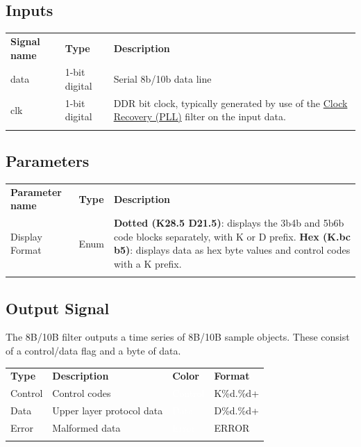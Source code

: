 \subsection{Inputs}

\begin{tabularx}{16cm}{llX}
\thickhline
\textbf{Signal name} & \textbf{Type} & \textbf{Description} \\
\thickhline
data & 1-bit digital & Serial 8b/10b data line \\
\thickhline
clk & 1-bit digital & DDR bit clock, typically generated by use of the \hyperref[filter:cdrpll]{Clock Recovery
(PLL)} filter on the input data.\\
\thickhline
\end{tabularx}

\subsection{Parameters}

\begin{tabularx}{16cm}{llX}
\thickhline
\textbf{Parameter name} & \textbf{Type} & \textbf{Description} \\
\thickhline
Display Format & Enum &
	\textbf{Dotted (K28.5 D21.5)}: displays the 3b4b and 5b6b code blocks separately, with K or D prefix. \newline
	\textbf{Hex (K.bc b5)}: displays data as hex byte values and control codes with a K prefix. \\
\thickhline
\end{tabularx}

\subsection{Output Signal}

The 8B/10B filter outputs a time series of 8B/10B sample objects. These consist of a control/data flag and a byte of
data.

\begin{tabularx}{16cm}{lllX}
\thickhline
\textbf{Type} & \textbf{Description} & \textbf{Color} & \textbf{Format} \\
\thickhline
Control & Control codes & \cellcolor{control}\textcolor{white}{Control} & K\%d.\%d+ \\
\thickhline
Data & Upper layer protocol data & \cellcolor{data}\textcolor{white}{Data} & D\%d.\%d+ \\
\thickhline
Error & Malformed data & \cellcolor{error}\textcolor{white}{Error} & ERROR \\
\thickhline
\end{tabularx}

